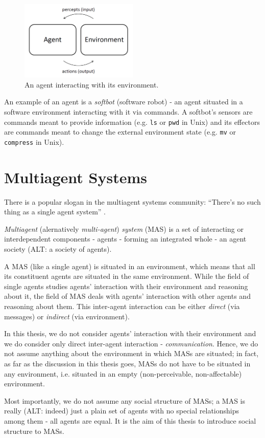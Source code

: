 \begin{figure}[h]
	\centering
	\includegraphics[width=0.5\textwidth]{images/agent-environment-interaction.png}
	\caption{An agent interacting with its environment.}
	\label{figure:agent-environment-interaction}
\end{figure}

An example of an agent is a \textit{softbot} (software robot) - an agent situated in a software environment interacting with it via commands. A softbot's sensors are commands meant to provide information (e.g. \texttt{ls} or \texttt{pwd} in Unix) and its effectors are commands meant to change the external environment state (e.g. \texttt{mv} or \texttt{compress} in Unix).

\section{Multiagent Systems}

There is a popular slogan in the multiagent systems community: ``There's no such thing as a single agent system'' \cite{Wooldridge09}.

\textit{Multiagent} (alernatively \textit{multi-agent}) \textit{system} (MAS) is a set of interacting or interdependent components - agents - forming an integrated whole - an agent society (ALT: a society of agents).

A MAS (like a single agent) is situated in an environment, which means that all its constituent agents are situated in the same environment.
While the field of single agents studies agents' interaction with their environment and reasoning about it, the field of MAS deals with agents' interaction with other agents and reasoning  about them.
This inter-agent interaction can be either \textit{direct} (via messages) or \textit{indirect} (via environment).

In this thesis, we do not consider agents' interaction with their environment and we do consider only direct inter-agent interaction - \textit{communication}.
Hence, we do not assume anything about the environment in which MASs are situated; in fact, as far as the discussion in this thesis goes, MASs do not have to be situated in any environment, i.e. situated in an empty (non-perceivable, non-affectable) environment.

Most importantly, we do not assume any social structure of MASs; a MAS is really (ALT: indeed) just a plain set of agents with no special relationships among them - all agents are equal.
It is the aim of this thesis to introduce social structure to MASs.
